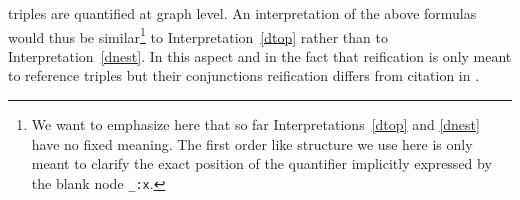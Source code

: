 triples are quantified at graph level. 
An interpretation of the above formulas would thus be similar\footnote{We want to emphasize here that so far Interpretations~\ref{dtop} and \ref{dnest} have no fixed meaning. 
The first order like structure we use here is only meant to clarify the exact position of the quantifier implicitly expressed by the blank node \texttt{\_:x}.} to Interpretation~\ref{dtop} rather than to Interpretation~\ref{dnest}.
%
 In this aspect  and in the fact that reification is only meant to reference triples but their conjunctions 
 \rdf reification differs from citation in \nthree.

